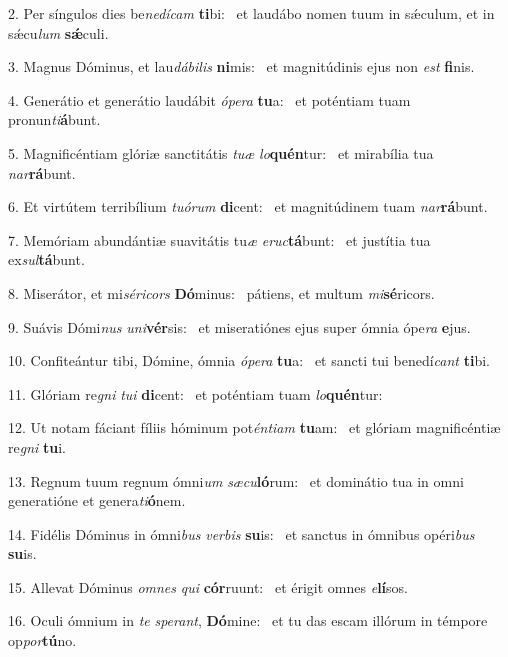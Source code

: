 2. Per síngulos dies be\textit{ne}\textit{dí}\textit{cam} \textbf{ti}bi: \ast\  et laudábo nomen tuum in sǽculum, et in sǽcu\textit{lum} \textbf{sǽ}culi.\

3. Magnus Dóminus, et lau\textit{dá}\textit{bi}\textit{lis} \textbf{ni}mis: \ast\  et magnitúdinis ejus non \textit{est} \textbf{fi}nis.\

4. Generátio et generátio laudábit \textit{ó}\textit{pe}\textit{ra} \textbf{tu}a: \ast\  et poténtiam tuam pronun\textit{ti}\textbf{á}bunt.\

5. Magnificéntiam glóriæ sanctitátis \textit{tu}\textit{æ} \textit{lo}\textbf{quén}tur: \ast\  et mirabília tua \textit{nar}\textbf{rá}bunt.\

6. Et virtútem terribílium \textit{tu}\textit{ó}\textit{rum} \textbf{di}cent: \ast\  et magnitúdinem tuam \textit{nar}\textbf{rá}bunt.\

7. Memóriam abundántiæ suavitátis tu\textit{æ} \textit{e}\textit{ruc}\textbf{tá}bunt: \ast\  et justítia tua ex\textit{sul}\textbf{tá}bunt.\

8. Miserátor, et mi\textit{sé}\textit{ri}\textit{cors} \textbf{Dó}minus: \ast\  pátiens, et multum \textit{mi}\textbf{sé}ricors.\

9. Suávis Dómi\textit{nus} \textit{u}\textit{ni}\textbf{vér}sis: \ast\  et miseratiónes ejus super ómnia ópe\textit{ra} \textbf{e}jus.\

10. Confiteántur tibi, Dómine, ómnia \textit{ó}\textit{pe}\textit{ra} \textbf{tu}a: \ast\  et sancti tui benedí\textit{cant} \textbf{ti}bi.\

11. Glóriam re\textit{gni} \textit{tu}\textit{i} \textbf{di}cent: \ast\  et poténtiam tuam \textit{lo}\textbf{quén}tur:\

12. Ut notam fáciant fíliis hóminum pot\textit{én}\textit{ti}\textit{am} \textbf{tu}am: \ast\  et glóriam magnificéntiæ re\textit{gni} \textbf{tu}i.\

13. Regnum tuum regnum ómni\textit{um} \textit{sæ}\textit{cu}\textbf{ló}rum: \ast\  et dominátio tua in omni generatióne et genera\textit{ti}\textbf{ó}nem.\

14. Fidélis Dóminus in ómni\textit{bus} \textit{ver}\textit{bis} \textbf{su}is: \ast\  et sanctus in ómnibus opéri\textit{bus} \textbf{su}is.\

15. Allevat Dóminus \textit{om}\textit{nes} \textit{qui} \textbf{cór}ruunt: \ast\  et érigit omnes \textit{e}\textbf{lí}sos.\

16. Oculi ómnium in \textit{te} \textit{spe}\textit{rant}, \textbf{Dó}mine: \ast\  et tu das escam illórum in témpore op\textit{por}\textbf{tú}no.\

